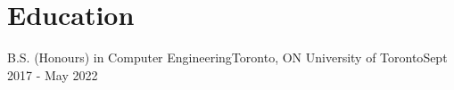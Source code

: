 \section{Education}
\resumeSubHeadingListStart
    \resumeSubheading
    {B.S. (Honours) in Computer Engineering}{Toronto, ON}
    {University of Toronto}{Sept 2017 - May 2022}
    \resumeItemListStart
    \resumeItemListEnd
\resumeSubHeadingListEnd 